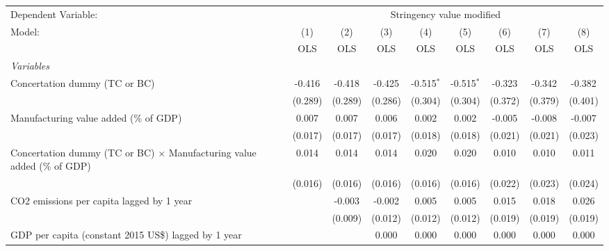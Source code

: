 
\begingroup
\centering
\begin{tabular}{lcccccccc}
   \toprule
   Dependent Variable: & \multicolumn{8}{c}{Stringency value modified}\\
   Model:                                                                         & (1)     & (2)     & (3)     & (4)          & (5)          & (6)          & (7)           & (8)\\  
                                                                                  &  OLS    & OLS     & OLS     & OLS          & OLS          & OLS          & OLS           & OLS\\  
   \midrule
   \emph{Variables}\\
   Concertation dummy (TC or BC)                                                  & -0.416  & -0.418  & -0.425  & -0.515$^{*}$ & -0.515$^{*}$ & -0.323       & -0.342        & -0.382\\   
                                                                                  & (0.289) & (0.289) & (0.286) & (0.304)      & (0.304)      & (0.372)      & (0.379)       & (0.401)\\   
   Manufacturing value added (\% of GDP)                                          & 0.007   & 0.007   & 0.006   & 0.002        & 0.002        & -0.005       & -0.008        & -0.007\\   
                                                                                  & (0.017) & (0.017) & (0.017) & (0.018)      & (0.018)      & (0.021)      & (0.021)       & (0.023)\\   
   Concertation dummy (TC or BC) $\times$ Manufacturing value added (\% of GDP)   & 0.014   & 0.014   & 0.014   & 0.020        & 0.020        & 0.010        & 0.010         & 0.011\\   
                                                                                  & (0.016) & (0.016) & (0.016) & (0.016)      & (0.016)      & (0.022)      & (0.023)       & (0.024)\\   
   CO2 emissions per capita lagged by 1 year                                      &         & -0.003  & -0.002  & 0.005        & 0.005        & 0.015        & 0.018         & 0.026\\   
                                                                                  &         & (0.009) & (0.012) & (0.012)      & (0.012)      & (0.019)      & (0.019)       & (0.019)\\   
   GDP per capita (constant 2015 US\$) lagged by 1 year                           &         &         & 0.000   & 0.000        & 0.000        & 0.000        & 0.000         & 0.000\\   

\end{tabular}

